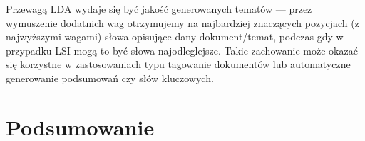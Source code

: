 \documentclass[11pt,a4paper]{article}
\begin{document}
Przewagą LDA wydaje się być jakość generowanych tematów --- przez wymuszenie
dodatnich wag otrzymujemy na najbardziej znaczących pozycjach (z najwyższymi
wagami) słowa opisujące dany dokument/temat, podczas gdy w przypadku LSI mogą
to być słowa najodleglejsze. Takie zachowanie może okazać się korzystne w
zastosowaniach typu tagowanie dokumentów lub automatyczne generowanie
podsumowań czy słów kluczowych.

\section{Podsumowanie}




\enddocument
\end{document}
